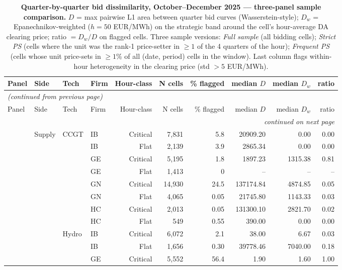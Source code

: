 \small
\begin{longtable}{@{}l l l l r r r r r r@{}}
\caption{\textbf{Quarter-by-quarter bid dissimilarity, October--December 2025 --- three-panel sample comparison.} $D$ = max pairwise L1 area between quarter bid curves (Wasserstein-style); $D_w$ = Epanechnikov-weighted ($h = 50$ EUR/MWh) on the strategic band around the cell's hour-average DA clearing price; ratio $= D_w/D$ on flagged cells. Three sample versions: \emph{Full sample} (all bidding cells); \emph{Strict PS} (cells where the unit was the rank-1 price-setter in $\ge 1$ of the 4 quarters of the hour); \emph{Frequent PS} (cells whose unit price-sets in $\ge 1$\% of all (date, period) cells in the window). Last column flags within-hour heterogeneity in the clearing price (std $> 5$ EUR/MWh).}\label{tab:quarter_dissim}\\
\toprule
Panel & Side & Tech & Firm & Hour-class & N cells & \% flagged & median $D$ & median $D_w$ & ratio \\
\midrule
\endfirsthead
\multicolumn{10}{l}{\emph{(continued from previous page)}} \\
\toprule
Panel & Side & Tech & Firm & Hour-class & N cells & \% flagged & median $D$ & median $D_w$ & ratio \\
\midrule
\endhead
\midrule
\multicolumn{10}{r}{\emph{continued on next page}} \\
\endfoot
\bottomrule
\endlastfoot
\midrule
 & Supply & CCGT & IB & Critical & 7,831 & 5.8 & 20909.20 & 0.00 & 0.00 \\
 &  &  & IB & Flat & 2,139 & 3.9 & 2865.34 & 0.00 & 0.00 \\
 &  &  & GE & Critical & 5,195 & 1.8 & 1897.23 & 1315.38 & 0.81 \\
 &  &  & GE & Flat & 1,413 & 0 & -- & -- & -- \\
 &  &  & GN & Critical & 14,930 & 24.5 & 137174.84 & 4874.85 & 0.05 \\
 &  &  & GN & Flat & 4,065 & 0.05 & 21745.80 & 1143.33 & 0.03 \\
 &  &  & HC & Critical & 2,013 & 0.05 & 131300.10 & 2821.70 & 0.02 \\
 &  &  & HC & Flat & 549 & 0.55 & 390.00 & 0.00 & 0.00 \\
\addlinespace
 &  & Hydro & IB & Critical & 6,072 & 2.1 & 38.00 & 6.67 & 0.03 \\
 &  &  & IB & Flat & 1,656 & 0.30 & 39778.46 & 7040.00 & 0.18 \\
 &  &  & GE & Critical & 5,552 & 56.4 & 1.90 & 1.60 & 1.00 \\

\end{longtable}

